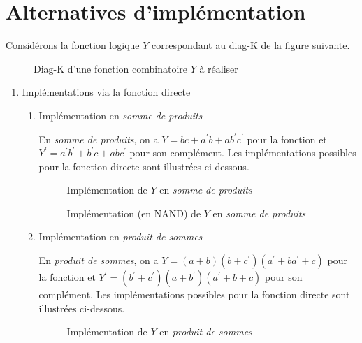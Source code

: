 \documentclass[letter, oneside]{book}
\begin{document}
\section{Alternatives d'implémentation}
\label{sec:org064012b}

Considérons la fonction logique \(Y\) correspondant au diag-K de la
figure suivante.

\begin{figure}[htbp]
\centering

\caption{\label{fig:org58cff00}Diag-K d'une fonction combinatoire \(Y\) à réaliser}
\end{figure} 

\begin{enumerate}
\item Implémentations via la fonction directe
\label{sec:orge572494}

\begin{enumerate}
\item Implémentation en \emph{somme de produits}
\label{sec:orgc52ba80}

En \emph{somme de produits}, on a \(Y = bc + a^\prime b + a b^\prime
c^\prime\) pour la fonction et \(Y^\prime = a^\prime b^\prime +
b^\prime c + a b c^\prime\) pour son complément. Les implémentations
possibles pour la fonction directe sont illustrées ci-dessous.

\begin{figure}[htbp]
\centering

\caption{\label{fig:org7acecd6}Implémentation de \(Y\) en \emph{somme de produits}}
\end{figure} 


\begin{figure}[htbp]
\centering

\caption{\label{fig:org610f525}Implémentation (en NAND) de \(Y\) en \emph{somme de produits}}
\end{figure} 


\item Implémentation en \emph{produit de sommes}
\label{sec:org3fcd6c6}

En \emph{produit de sommes}, on a \(Y =(a + b ) (b + c^\prime ) (a^\prime +
ba^\prime + c)\) pour la fonction et \(Y^\prime = (b^\prime +c^\prime
)(a+b^\prime )(a^\prime +b+c)\) pour son complément.  Les implémentations
possibles pour la fonction directe sont illustrées ci-dessous.


\begin{figure}[htbp]
\centering

\caption{\label{fig:orgbb5fdfc}Implémentation de \(Y\) en \emph{produit de sommes}}
\end{figure} 


\end{enumerate}
\end{enumerate}
\end{document}
